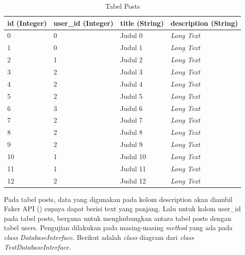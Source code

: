 \begin{table}[H]
  \centering{}
  \begin{tabular}{|m{2cm}|m{2cm}|m{3cm}|m{3cm}|}
      \hline
      \textbf{id (Integer)} & \textbf{user\_id (Integer)} & \textbf{title (String)} &  \textbf{description (String)} \\
      \hline
      0 & 0 & Judul 0 & \emph{Long Text} \\ 
      \hline
      1 & 0 & Judul 1 & \emph{Long Text} \\ 
      \hline
      2 & 1 & Judul 2 & \emph{Long Text} \\ 
      \hline
      3 & 2 & Judul 3 & \emph{Long Text} \\ 
      \hline
      4 & 2 & Judul 4 & \emph{Long Text} \\ 
      \hline
      5 & 2 & Judul 5 & \emph{Long Text} \\ 
      \hline
      6 & 3 & Judul 6 & \emph{Long Text} \\ 
      \hline
      7 & 2 & Judul 7 & \emph{Long Text} \\ 
      \hline
      8 & 2 & Judul 8 & \emph{Long Text} \\ 
      \hline
      9 & 2 & Judul 9 & \emph{Long Text} \\ 
      \hline
      10 & 1 & Judul 10 & \emph{Long Text} \\ 
      \hline
      11 & 1 & Judul 11 & \emph{Long Text} \\ 
      \hline
      12 & 2 & Judul 12 & \emph{Long Text} \\ 
      \hline
  \end{tabular}
  \caption{Tabel Posts}
\end{table}

Pada tabel posts, data yang digunakan pada kolom description akan diambil Faker API (\cite{faker}) supaya dapat berisi text yang panjang.
Lalu untuk kolom user\_id pada tabel posts, berguna untuk menghubungkan antara tabel posts dengan tabel users.
Pengujian dilakukan pada masing-masing \emph{method} yang ada pada \emph{class} \emph{DatabaseInterface}. Berikut adalah \emph{class} diagram
dari \emph{class} \emph{TestDatabaseInterface}.

